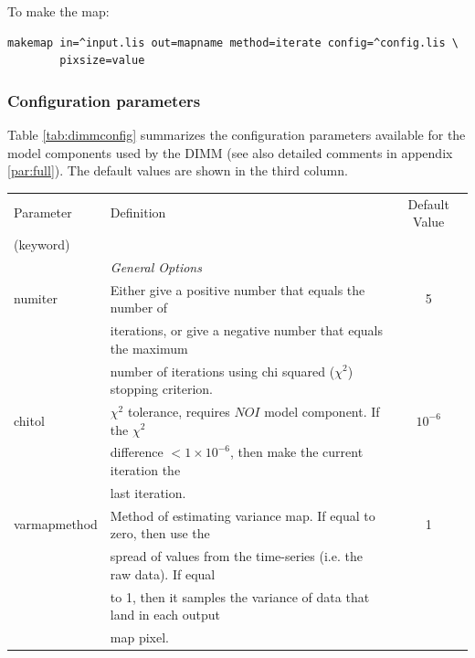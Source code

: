 \documentclass[twoside,11pt]{article}
\renewcommand{\_}{\texttt{\symbol{95}}}
\begin{document}
To make the map:
\begin{verbatim}
makemap in=^input.lis out=mapname method=iterate config=^config.lis \
        pixsize=value
\end{verbatim}


\subsubsection{Configuration parameters}

Table \ref{tab:dimmconfig} summarizes the configuration parameters
available for the model components used by the DIMM (see also detailed
comments in appendix \ref{par:full}). The default values are shown in the
third column.

\begin{table}
\footnotesize
\centering
\begin{tabular}{llc}
\hline
Parameter        & Definition                                                         &  Default Value \\
(keyword)        &                                                                    & \\
\hline
                 & \multicolumn{2}{l}{\em General Options} \\
\hline
numiter          & Either give a positive number that equals the number of             & 5\\
                 & iterations, or give a negative number that equals the maximum       & \\
                 & number of iterations using chi squared ($\chi^2$) stopping criterion.& \\
chitol           & $\chi^2$ tolerance, requires $NOI$ model component. If the $\chi^2$ & $10^{-6}$\\
                 & difference $<1\times10^{-6}$, then make the current iteration the   & \\
                 & last iteration.                                                     & \\
varmapmethod     & Method of estimating variance map. If equal to zero, then use the   & 1 \\
                 & spread of values from the time-series (i.e. the raw data). If equal & \\
                 & to 1, then it samples the variance of data that land in each output & \\
                 & map pixel.                                                          & \\

\end{tabular}
\end{table}
\end{document}
